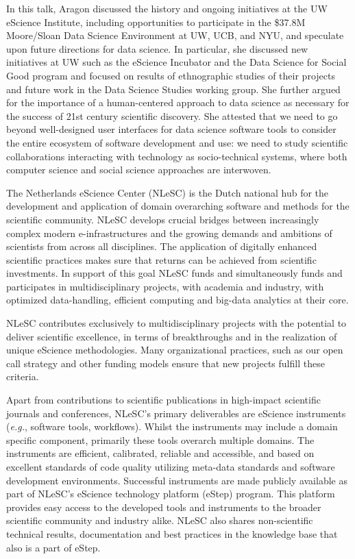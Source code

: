 \documentclass[a4paper,UKenglish]{dagrep}
\newcommand{\eg}{\emph{e.g.},\xspace}
\begin{document}
In this talk, Aragon discussed the history and ongoing initiatives at the UW eScience Institute, including opportunities to participate in the \$37.8M Moore/Sloan Data Science Environment at UW, UCB, and NYU, and speculate upon future directions for data science. In particular, she discussed new initiatives at UW such as the eScience Incubator and the Data Science for Social Good program and focused on results of ethnographic studies of their projects and future work in the Data Science Studies working group. She further argued for the importance of a human-centered approach to data science as necessary for the success of 21st century scientific discovery. She attested that we need to go beyond well-designed user interfaces for data science software tools to consider the entire ecosystem of software development and use: we need to study scientific collaborations interacting with technology as socio-technical systems, where both computer science and social science approaches are interwoven.


The Netherlands eScience Center (NLeSC) is the Dutch national hub for
the development and application of domain overarching software and
methods for the scientific community. NLeSC develops crucial bridges
between increasingly complex modern e-infrastructures and the growing
demands and ambitions of scientists from across all disciplines. The
application of digitally enhanced scientific practices makes sure that
returns can be achieved from scientific investments. In support of this
goal NLeSC funds and simultaneously funds and participates in
multidisciplinary projects, with academia and industry, with optimized
data-handling, efficient computing and big-data analytics at their
core.

NLeSC contributes exclusively to multidisciplinary projects with the
potential to deliver scientific excellence, in terms of breakthroughs
and in the realization of unique eScience methodologies. Many
organizational practices, such as our open call strategy and other
funding models ensure that new projects fulfill these criteria.

Apart from contributions to scientific publications in high-impact
scientific journals and conferences, NLeSC's primary deliverables are
eScience instruments (\eg software tools, workflows). Whilst the
instruments may include a domain specific component, primarily these
tools overarch multiple domains. The instruments are efficient,
calibrated, reliable and accessible, and based on excellent standards
of code quality utilizing meta-data standards and software development
environments. Successful instruments are made publicly available as
part of NLeSC's eScience technology platform (eStep) program. This
platform provides easy access to the developed tools and instruments
to the broader scientific community and industry alike. NLeSC also
shares non-scientific technical results, documentation and best
practices in the knowledge base that also is a part of eStep.
\end{document}
